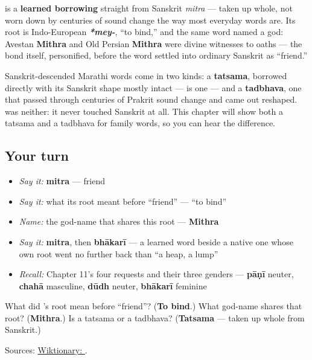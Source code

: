 \begin{cousinweb}
\textbf{} is a \textbf{learned borrowing} straight from Sanskrit \textbf{} \emph{mitra} — taken up whole, not worn down by centuries of sound change the way most everyday words are. Its root is Indo-European \emph{\textbf{*mey-}}, \textquotedblleft{}to bind,\textquotedblright{} and the same word named a god: Avestan \textbf{Mithra} and Old Persian \textbf{Mithra} were divine witnesses to oaths — the bond itself, personified, before the word settled into ordinary Sanskrit as \textquotedblleft{}friend.\textquotedblright{}
\end{cousinweb}

\begin{grammarlens}[title={Grammar Lens: taken up whole, not worn down}]
Sanskrit-descended Marathi words come in two kinds: a \textbf{tatsama}, borrowed directly with its Sanskrit shape mostly intact — \textbf{} is one — and a \textbf{tadbhava}, one that passed through centuries of Prakrit sound change and came out reshaped. \textbf{} was neither: it never touched Sanskrit at all. This chapter will show both a tatsama and a tadbhava for family words, so you can hear the difference.
\end{grammarlens}

\subsection*{Your turn}
\begin{itemize}
\raggedright
  \item \emph{Say it:} \textbf{mitra} — friend
  \item \emph{Say it:} what its root meant before \textquotedblleft{}friend\textquotedblright{} — \textquotedblleft{}to bind\textquotedblright{}
  \item \emph{Name:} the god-name that shares this root — \textbf{Mithra}
  \item \emph{Say it:} \textbf{mitra}, then \textbf{bhākarī} — a learned word beside a native one whose own root went no further back than \textquotedblleft{}a heap, a lump\textquotedblright{}
  \item \emph{Recall:} Chapter 11's four requests and their three genders — \textbf{pāṇī} neuter, \textbf{chahā} masculine, \textbf{dūdh} neuter, \textbf{bhākarī} feminine
\end{itemize}

\begin{tcolorbox}[breakable,colback=teal!4,colframe=teal!35!black,title={Before you move on}]
What did \textbf{}'s root mean before \textquotedblleft{}friend\textquotedblright{}? (\textbf{To bind}.) What god-name shares that root? (\textbf{Mithra}.) Is \textbf{} a tatsama or a tadbhava? (\textbf{Tatsama} — taken up whole from Sanskrit.)

Sources: \href{https://en.wiktionary.org/wiki/\%E0\%A4\%AE\%E0\%A4\%BF\%E0\%A4\%A4\%E0\%A5\%8D\%E0\%A4\%B0}{Wiktionary: }.
\end{tcolorbox}
